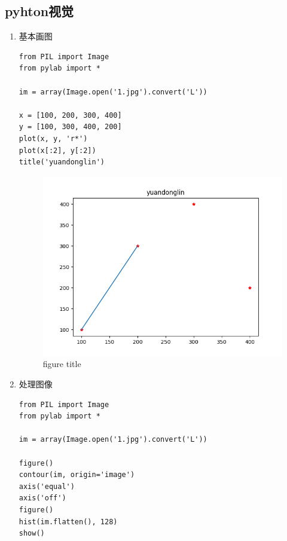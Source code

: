 \documentclass[a4paper, 12pt]{article}
\begin{document}
\subsection{pyhton视觉}
\begin{enumerate}
\item{\large 基本画图}
    \begin{lstlisting}
from PIL import Image
from pylab import *

im = array(Image.open('1.jpg').convert('L'))

x = [100, 200, 300, 400]
y = [100, 300, 400, 200]
plot(x, y, 'r*')
plot(x[:2], y[:2])
title('yuandonglin')
    \end{lstlisting}
    \begin{figure}[htbp]
        \centering
        \includegraphics[scale=0.5]{Figure_1.png}
        \caption{figure title}
        \label{figure}
      \end{figure}
\item{\large 处理图像}
    \begin{lstlisting}
from PIL import Image
from pylab import *

im = array(Image.open('1.jpg').convert('L'))

figure()
contour(im, origin='image')
axis('equal')
axis('off')
figure()
hist(im.flatten(), 128)
show()


\end{lstlisting}
\end{enumerate}
\end{document}
